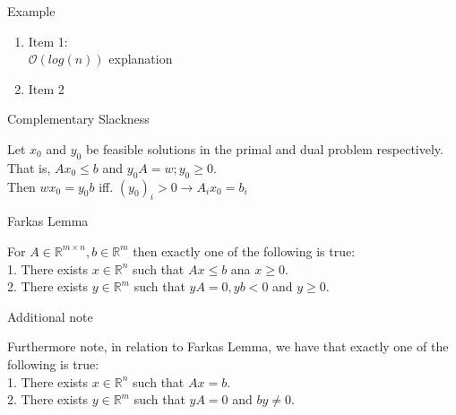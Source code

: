 \documentclass{beamer}
\begin{document}
\begin{frame}{Example}
	\begin{enumerate}
		\pause
		\item Item 1:\\
		 $\mathcal{O}(log(n))$ explanation
		\pause
		\item Item 2 
	\end{enumerate}
\end{frame}


\begin{frame}  %
	\begin{block}{Complementary Slackness}

		Let $x_0$ and $y_0$ be feasible solutions in the primal and dual problem respectively.
		That is, $Ax_0 \leq b$ and $y_0 A = w; y_0 \geq 0$. \\
		Then $w x_0 = y_0 b$ iff. $(y_0)_i > 0  \rightarrow A_i x_0 = b_i$

	\end{block}	

	\pause

	\begin{block}{Farkas Lemma}

		For $A \in \mathbb{R}^{m \times n}, b \in \mathbb{R}^{m}$ then exactly one of the following is true: \\
		1. There exists $x \in \mathbb{R}^n$ such that $Ax \leq b$ ana $x\geq 0$. \\
		2. There exists $y \in \mathbb{R}^m$ such that $yA=0, yb<0$ and $y \geq 0$. 

	\end{block}

	\pause 

	\begin{block}{Additional note}

		Furthermore note, in relation to Farkas Lemma, we have that exactly one of the following is true: \\
		1. There exists $x \in \mathbb{R}^n$ such that $Ax=b$. \\
		2. There exists $y \in \mathbb{R}^m$ such that $yA=0$ and $by \neq 0$.


	\end{block}

\end{frame}
\end{document}
